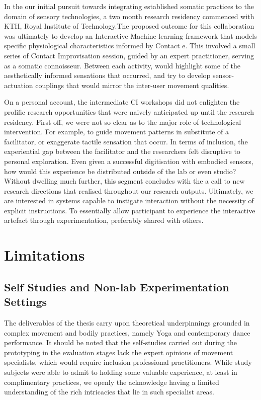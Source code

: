 In the our initial pursuit towards integrating established somatic practices to the domain of sensory technologies, a two month research residency commenced with KTH, Royal Institute of Technology.The proposed outcome for this collaboration was ultimately to develop an Interactive Machine learning framework that models specific physiological characteristics informed by Contact e. This involved a small series of Contact Improvisation session, guided by an expert practitioner, serving as a somatic connoisseur. Between each activity, would highlight some of the aesthetically informed sensations that occurred, and try to develop sensor-actuation couplings that would mirror the inter-user movement qualities.

On a personal account, the intermediate CI workshops did not enlighten the prolific research opportunities that were naively anticipated up until the research residency. First off, we were not so clear as to the major role of technological intervention. For example, to guide movement patterns in substitute of a facilitator, or exaggerate tactile sensation that occur. In terms of inclusion, the experiential gap between the facilitator and the researchers felt disruptive to personal exploration. Even given a successful digitisation with embodied sensors, how would this experience be distributed outside of the lab or even studio? Without dwelling much further, this segment concludes with the a call to new research directions that realised throughout our research outputs. Ultimately, we are interested in systems capable to instigate interaction without the necessity of explicit instructions. To essentially allow participant to experience the interactive artefact through experimentation, preferably shared with others.

\section{Limitations}
\label{sec:limitations}

\subsection{Self Studies and Non-lab Experimentation Settings}

The deliverables of the thesis carry upon theoretical underpinnings grounded in complex movement and bodily practices, namely Yoga and contemporary dance performance. It should be noted that the self-studies carried out during the prototyping in the evaluation stages lack the expert opinions of movement specialists, which would require inclusion professional practitioners. While study subjects were able to admit to holding some valuable experience, at least in complimentary practices, we openly the acknowledge having a limited understanding of the rich intricacies that lie in such specialist areas.

